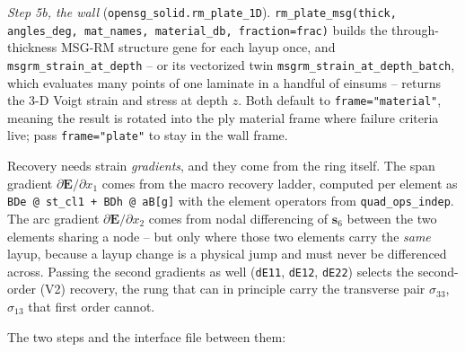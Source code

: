 \emph{Step 5b, the wall} (\texttt{opensg\_solid.rm\_plate\_1D}).
\texttt{rm\_plate\_msg(thick, angles\_deg, mat\_names, material\_db,
fraction=frac)} builds the through-thickness MSG-RM structure gene for each
layup once, and \texttt{msgrm\_strain\_at\_depth} -- or its vectorized twin
\texttt{msgrm\_strain\_at\_depth\_batch}, which evaluates many points of one
laminate in a handful of einsums -- returns the 3-D Voigt strain and stress at
depth $z$. Both default to \texttt{frame="material"}, meaning the result is
rotated into the ply material frame where failure criteria live; pass
\texttt{frame="plate"} to stay in the wall frame.

Recovery needs strain \emph{gradients}, and they come from the ring itself. The
span gradient $\partial\mathbf{E}/\partial x_1$ comes from the macro recovery
ladder, computed per element as \texttt{BDe @ st\_cl1 + BDh @ aB[g]} with the
element operators from \texttt{quad\_ops\_indep}. The arc gradient
$\partial\mathbf{E}/\partial x_2$ comes from nodal differencing of
$\mathbf{s}_6$ between the two elements sharing a node -- but only where those
two elements carry the \emph{same} layup, because a layup change is a physical
jump and must never be differenced across. Passing the second gradients as well
(\texttt{dE11}, \texttt{dE12}, \texttt{dE22}) selects the second-order (V2)
recovery, the rung that can in principle carry the transverse pair
$\sigma_{33}$, $\sigma_{13}$ that first order cannot.

The two steps and the interface file between them:

